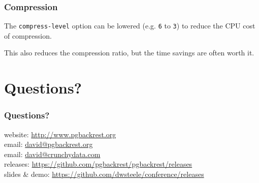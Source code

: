 \begin{frame}
    \frametitle{Compression}

    The \texttt{compress-level} option can be lowered (e.g. \texttt{6} to \texttt{3}) to reduce the CPU cost of compression.

    This also reduces the compression ratio, but the time savings are often worth it.
\end{frame}

\section{Questions?}

\begin{frame}
    \frametitle{Questions?}

    website: \url{http://www.pgbackrest.org}\\
    \vspace{1em}
    email: \href{mailto:david@pgbackrest.org}{david@pgbackrest.org} \\
    email: \href{mailto:david@crunchydata.com}{david@crunchydata.com}\\
    \vspace{1em}
    releases: \url{https://github.com/pgbackrest/pgbackrest/releases}\\
    \vspace{1em}
    slides \& demo: \url{https://github.com/dwsteele/conference/releases}\\
\end{frame}


